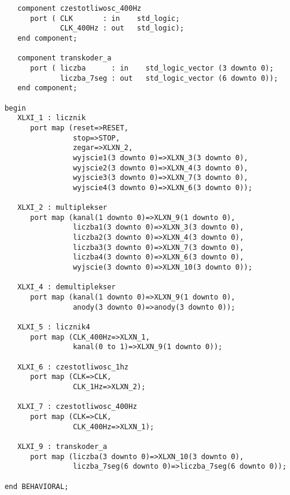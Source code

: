 \begin{lstlisting}
       component czestotliwosc_400Hz
          port ( CLK       : in    std_logic; 
                 CLK_400Hz : out   std_logic);
       end component;
       
       component transkoder_a
          port ( liczba      : in    std_logic_vector (3 downto 0); 
                 liczba_7seg : out   std_logic_vector (6 downto 0));
       end component;
       
    begin
       XLXI_1 : licznik
          port map (reset=>RESET,
                    stop=>STOP,
                    zegar=>XLXN_2,
                    wyjscie1(3 downto 0)=>XLXN_3(3 downto 0),
                    wyjscie2(3 downto 0)=>XLXN_4(3 downto 0),
                    wyjscie3(3 downto 0)=>XLXN_7(3 downto 0),
                    wyjscie4(3 downto 0)=>XLXN_6(3 downto 0));
       
       XLXI_2 : multiplekser
          port map (kanal(1 downto 0)=>XLXN_9(1 downto 0),
                    liczba1(3 downto 0)=>XLXN_3(3 downto 0),
                    liczba2(3 downto 0)=>XLXN_4(3 downto 0),
                    liczba3(3 downto 0)=>XLXN_7(3 downto 0),
                    liczba4(3 downto 0)=>XLXN_6(3 downto 0),
                    wyjscie(3 downto 0)=>XLXN_10(3 downto 0));
       
       XLXI_4 : demultiplekser
          port map (kanal(1 downto 0)=>XLXN_9(1 downto 0),
                    anody(3 downto 0)=>anody(3 downto 0));
       
       XLXI_5 : licznik4
          port map (CLK_400Hz=>XLXN_1,
                    kanal(0 to 1)=>XLXN_9(1 downto 0));
       
       XLXI_6 : czestotliwosc_1hz
          port map (CLK=>CLK,
                    CLK_1Hz=>XLXN_2);
       
       XLXI_7 : czestotliwosc_400Hz
          port map (CLK=>CLK,
                    CLK_400Hz=>XLXN_1);
       
       XLXI_9 : transkoder_a
          port map (liczba(3 downto 0)=>XLXN_10(3 downto 0),
                    liczba_7seg(6 downto 0)=>liczba_7seg(6 downto 0));
       
    end BEHAVIORAL;    
\end{lstlisting}
